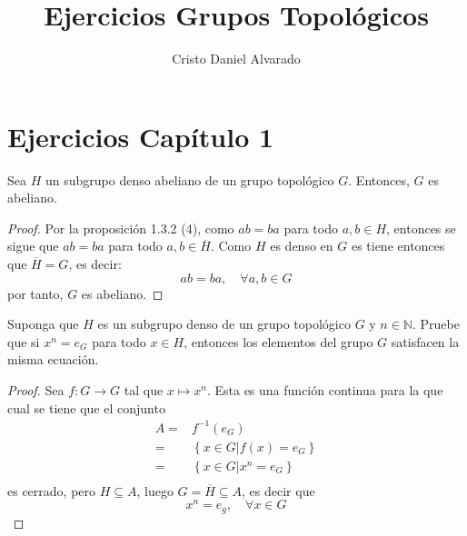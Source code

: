 \documentclass[12pt]{report}
\theoremstyle{largebreak}
\newcommand{\cf}[3]{\ensuremath{#1:#2\rightarrow#3}}
\newcommand{\Cls}[1]{\ensuremath{\overline{#1}}}
\begin{document}
    \setlength{\parskip}{5pt} %
    \setlength{\parindent}{12pt} %
    \title{Ejercicios Grupos Topológicos}
    \author{Cristo Daniel Alvarado}
    \maketitle

    \tableofcontents %

    \chapter{Ejercicios Capítulo 1}

    \begin{excer}
        Sea $H$ un subgrupo denso abeliano de un grupo topológico $G$. Entonces, $G$ es abeliano.
    \end{excer}

    \begin{proof}
        Por la proposición 1.3.2 (4), como $ab=ba$ para todo $a,b\in H$, entonces se sigue que $ab=ba$ para todo $a,b\in\Cls{H}$. Como $H$ es denso en $G$ es tiene entonces que $\Cls{H}=G$, es decir:
        \begin{equation*}
            ab=ba,\quad\forall a,b\in G
        \end{equation*}
        por tanto, $G$ es abeliano.
    \end{proof}

    \begin{excer}
        Suponga que $H$ es un subgrupo denso de un grupo topológico $G$ y $n\in\mathbb{N}$. Pruebe que si $x^n=e_G$ para todo $x\in H$, entonces los elementos del grupo $G$ satisfacen la misma ecuación.
    \end{excer}

    \begin{proof}
        Sea $\cf{f}{G}{G}$ tal que $x\mapsto x^n$. Esta es una función continua para la que cual se tiene que el conjunto
        \begin{equation*}
            \begin{split}
                A=&f^{-1}(e_G)\\
                =&\left\{x\in G\Big|f(x)=e_G \right\} \\
                =&\left\{x\in G\Big|x^n=e_G \right\} \\
            \end{split}
        \end{equation*}
        es cerrado, pero $H\subseteq A$, luego $G=\Cls{H}\subseteq A$, es decir que
        \begin{equation*}
            x^n=e_g,\quad\forall x\in G
        \end{equation*}
    \end{proof}
\end{document}
